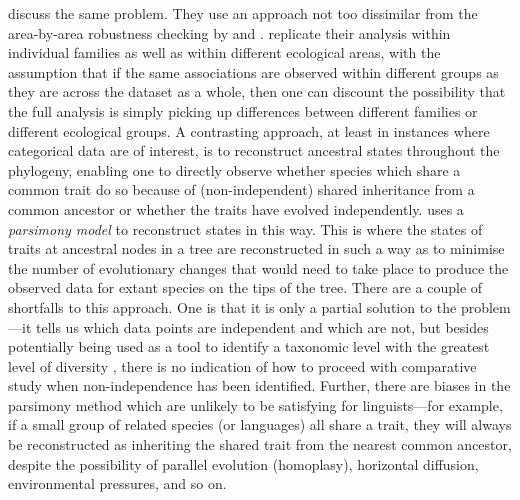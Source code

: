 \textcite[pp.~85--86]{baker_evolution_1979} discuss the same problem. They use an approach not too dissimilar from the area-by-area robustness checking by \textcite{dryer_large_1989} and \textcite{nichols_linguistic_1992}. \textcite{baker_evolution_1979} replicate their analysis within individual families as well as within different ecological areas, with the assumption that if the same associations are observed within different groups as they are across the dataset as a whole, then one can discount the possibility that the full analysis is simply picking up differences between different families or different ecological groups. A contrasting approach, at least in instances where categorical data are of interest, is to reconstruct ancestral states throughout the phylogeny, enabling one to directly observe whether species which share a common trait do so because of (non-independent) shared inheritance from a common ancestor or whether the traits have evolved independently. \textcite{gittleman_phylogeny_1981} uses a \emph{parsimony model} to reconstruct states in this way. This is where the states of traits at ancestral nodes in a tree are reconstructed in such a way as to minimise the number of evolutionary changes that would need to take place to produce the observed data for extant species on the tips of the tree. There are a couple of shortfalls to this approach. One is that it is only a partial solution to the problem---it tells us which data points are independent and which are not, but besides potentially being used as a tool to identify a taxonomic level with the greatest level of diversity \autocite[proceeding in a similar way to][]{clutton-brock_primate_1977}, there is no indication of how to proceed with comparative study when non-independence has been identified. Further, there are biases in the parsimony method \autocite[p.~7]{felsenstein_phylogenies_1985} which are unlikely to be satisfying for linguists---for example, if a small group of related species (or languages) all share a trait, they will always be reconstructed as inheriting the shared trait from the nearest common ancestor, despite the possibility of parallel evolution (homoplasy), horizontal diffusion, environmental pressures, and so on.

